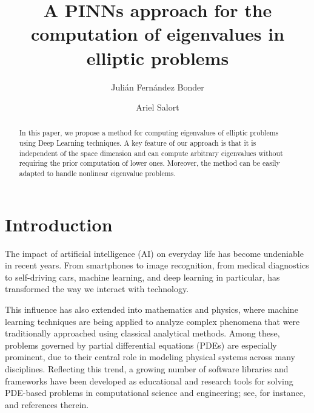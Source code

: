 \documentclass[11pt]{amsart}
\theoremstyle{definition}
\theoremstyle{remark}
\theoremstyle{plain}
\begin{document}
\title{A PINNs approach for the computation of eigenvalues in elliptic problems}

\author{Juli\'an Fern\'andez Bonder}
\address{Departamento de Matem\'atica, Facultad de Ciencias Exactas y Naturales, Universidad de Buenos Aires, Buenos Aires, Argentina, and Instituto de C\'alculo UBA-CONICET, Buenos Aires, Argentina}

\author{Ariel Salort}
\address{Departamento de Matem\'aticas Aplicadas y Ciencia de Datos, Universidad San Pablo-CEU, CEU Universities, Juli\'an Romea 2, 28003 Madrid, Spain}


\begin{abstract}
In this paper, we propose a method for computing eigenvalues of elliptic problems using Deep Learning techniques. A key feature of our approach is that it is independent of the space dimension and can compute arbitrary eigenvalues without requiring the prior computation of lower ones. Moreover, the method can be easily adapted to handle nonlinear eigenvalue problems.
\end{abstract}

\maketitle

\section{Introduction}

The impact of artificial intelligence (AI) on everyday life has become undeniable in recent years. From smartphones to image recognition, from medical diagnostics to self-driving cars, machine learning, and deep learning in particular, has transformed the way we interact with technology.

This influence has also extended into mathematics and physics, where machine learning techniques are being applied to analyze complex phenomena that were traditionally approached using classical analytical methods. Among these, problems governed by partial differential equations (PDEs) are especially prominent, due to their central role in modeling physical systems across many disciplines. Reflecting this trend, a growing number of software libraries and frameworks have been developed as educational and research tools for solving PDE-based problems in computational science and engineering; see, for instance, \cite{Lu-Meng-Mao, Rackauckas, Rackauckas-Innes-Ma-Bettencourt-etal} and references therein.
\end{document}
